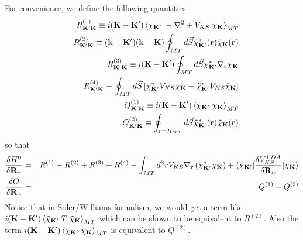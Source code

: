 \documentclass[aps,prb,floatfix,epsfig,singlecolumn,showpacs,preprintnumbers]{revtex4}
\newcommand{\vR}{{\mathbf{R}}}
\renewcommand{\vr}{{\mathbf{r}}}
\newcommand{\vk}{{\mathbf{k}}}
\newcommand{\vK}{{\mathbf{K}}}
\begin{document}
For convenience, we define the following quantities
\begin{eqnarray}
&& R^{(1)}_{\vK'\vK}\equiv  i(\vK-\vK')\braket{\chi_{\vK'}|-\nabla^2+V_{KS}|\chi_{\vK}}_{MT}\\
&& R^{(2)}_{\vK'\vK}\equiv (\vk+\vK')(\vk+\vK)\oint_{MT}d\vec{S}  \tilde{\chi}^*_{\vK'}(\vr) \tilde{\chi}_{\vK}(\vr)\\
&& R^{(3)}_{\vK'\vK}\equiv i(\vK-\vK') \oint_{MT} d\vec{S}\chi_{\vK'}^* \nabla_\vr \chi_{\vK}\\
&& R^{(4)}_{\vK'\vK}\equiv \oint_{MT} d\vec{S} \left[\chi^*_{\vK'} V_{KS} \chi_{\vK}-\tilde{\chi}^*_{\vK'} V_{KS} \tilde{\chi}_{\vK}\right]\\
&& Q^{(1)}_{\vK'\vK}\equiv i(\vK-\vK')\braket{\chi_{\vK'}|\chi_{\vK}}_{MT}\\
&& Q^{(2)}_{\vK'\vK}\equiv \oint_{r=R_{MT}} d\vec{S}  \tilde{\chi}^*_{\vK'}(\vr)\tilde{\chi}_{\vK}(\vr)\\
\end{eqnarray}
so that
\begin{eqnarray}
\frac{\delta  H^0}{\delta\vR_\alpha} &=& R^{(1)}-R^{(2)}+R^{(3)}+R^{(4)}
-\int_{MT} d^3r V_{KS} \nabla_\vr \left( \chi^*_{\vK'} \chi_{\vK}\right) 
+\braket{\chi_{\vK'}|\frac{\delta V_{KS}^{LDA}}{\delta\vR_\alpha}|\chi_{\vK}}\\
\frac{\delta  O}{\delta\vR_\alpha}  &=& Q^{(1)} - Q^{(2)} 
\end{eqnarray}
Notice that in Soler/Williams formalism, we would get a term like
$ i(\vK-\vK')\braket{\tilde{\chi}_{\vK'}|T|\tilde{\chi}_\vK}_{MT} $
which can be shown to be equivalent to $R^{(2)}$.
Also the term
$i(\vK-\vK')\braket{\tilde{\chi}_{\vK'}|\tilde{\chi}_{\vK}}_{MT}$ is
equivalent to $Q^{(2)}$.
\end{document}
